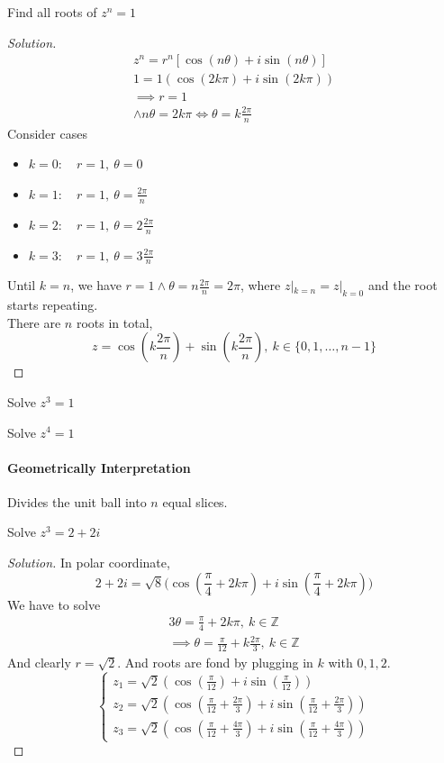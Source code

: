 \documentclass[11pt]{article}
\begin{document}
		\begin{example}
			Find all roots of $z^n = 1$
			\begin{proof}[Solution]
				\begin{gather*}
					z^n = r^n [\cos(n\theta) + i \sin(n \theta)] \\
					1 = 1(\cos(2k\pi) + i \sin(2k\pi)) \\
					\implies r = 1 \\
					\land n\theta = 2 k \pi \iff \theta = k \frac{2\pi}{n} 
				\end{gather*}
				Consider cases 
				\begin{itemize}
					\item $k=0:\quad r=1,\ \theta=0$
					\item $k=1:\quad r=1,\ \theta=\frac{2\pi}{n}$
					\item $k=2:\quad r=1,\ \theta=2\frac{2\pi}{n}$
					\item $k=3:\quad r=1,\ \theta=3\frac{2\pi}{n}$
				\end{itemize}
				Until $k=n$, we have $r=1 \land \theta=n\frac{2\pi}{n}=2\pi$, where $z|_{k=n} = z|_{k=0}$ and the root starts repeating. \\
				There are $n$ roots in total,
				\[
					z = \cos(k \frac{2\pi}{n}) + \sin(k \frac{2\pi}{n}),\ k \in \{0, 1, \dots, n-1\}
				\]
			\end{proof}
		\end{example}
		\begin{example}
			Solve $z^3 = 1$
		\end{example}
		\begin{example}
			Solve $z^4 = 1$
		\end{example}
		\paragraph{Geometrically Interpretation} Divides the unit ball into $n$ equal slices.
		\begin{example}
			Solve $z^3 = 2 + 2 i$
			\begin{proof}[Solution]
				In polar coordinate, 
				\[
					2+2i = \sqrt{8} \Big(\cos(\frac{\pi}{4} + 2k\pi) + i \sin(\frac{\pi}{4} + 2k\pi) \Big)
				\]
				We have to solve 
				\begin{gather*}
					3\theta = \frac{\pi}{4} + 2k\pi,\ k \in \mathbb{Z} \\
					\implies \theta = \frac{\pi}{12} + k \frac{2\pi}{3},\ k \in \mathbb{Z}
				\end{gather*}
				And clearly $r = \sqrt{2}$. And roots are fond by plugging in $k$ with $0,1,2$.
				\[
					\begin{cases}
						z_1 = \sqrt{2} (\cos(\frac{\pi}{12}) + i \sin(\frac{\pi}{12})) \\
						z_2 = \sqrt{2} (\cos(\frac{\pi}{12} + \frac{2\pi}{3}) + i \sin(\frac{\pi}{12} + \frac{2\pi}{3})) \\
						z_3 = \sqrt{2} (\cos(\frac{\pi}{12} + \frac{4\pi}{3}) + i \sin(\frac{\pi}{12} + \frac{4\pi}{3}))
					\end{cases}
				\]
			\end{proof}
		\end{example}
		
\end{document}
